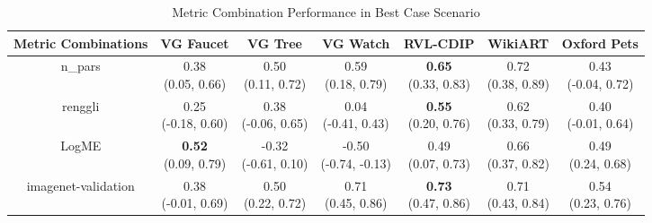 \begin{table}[H]
\centering
\caption{Metric Combination Performance in Best Case Scenario}
\label{tab:main-combo-results}
\setlength\tabcolsep{1.5pt}
\begin{tabular}{c|cccccc}
\textbf{Metric Combinations} & \textbf{VG Faucet} & \textbf{VG Tree} & \textbf{VG Watch} & \textbf{RVL-CDIP} & \textbf{WikiART} & \textbf{Oxford Pets} \\
\hline
n_pars & \makecell{0.38 \\[0pt] (0.05, 0.66)} & \makecell{0.50 \\[0pt] (0.11, 0.72)} & \makecell{0.59 \\[0pt] (0.18, 0.79)} & \makecell{\textbf{0.65} \\[0pt] (0.33, 0.83)} & \makecell{0.72 \\[0pt] (0.38, 0.89)} & \makecell{0.43 \\[0pt] (-0.04, 0.72)} \\
\hline
renggli & \makecell{0.25 \\[0pt] (-0.18, 0.60)} & \makecell{0.38 \\[0pt] (-0.06, 0.65)} & \makecell{0.04 \\[0pt] (-0.41, 0.43)} & \makecell{\textbf{0.55} \\[0pt] (0.20, 0.76)} & \makecell{0.62 \\[0pt] (0.33, 0.79)} & \makecell{0.40 \\[0pt] (-0.01, 0.64)} \\
\hline
LogME & \makecell{\textbf{0.52} \\[0pt] (0.09, 0.79)} & \makecell{-0.32 \\[0pt] (-0.61, 0.10)} & \makecell{-0.50 \\[0pt] (-0.74, -0.13)} & \makecell{0.49 \\[0pt] (0.07, 0.73)} & \makecell{0.66 \\[0pt] (0.37, 0.82)} & \makecell{0.49 \\[0pt] (0.24, 0.68)} \\
\hline
imagenet-validation & \makecell{0.38 \\[0pt] (-0.01, 0.69)} & \makecell{0.50 \\[0pt] (0.22, 0.72)} & \makecell{0.71 \\[0pt] (0.45, 0.86)} & \makecell{\textbf{0.73} \\[0pt] (0.47, 0.86)} & \makecell{0.71 \\[0pt] (0.43, 0.84)} & \makecell{0.54 \\[0pt] (0.23, 0.76)} \\

\end{tabular}
\end{table}

